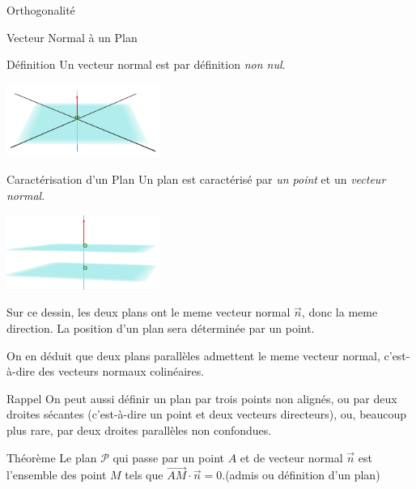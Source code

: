 \documentclass{cours}
\begin{document}
\begin{Gpartie}{Orthogonalité}
\begin{Spartie}{Vecteur Normal à un Plan}
\begin{SSpartie}{Définition}
                Un vecteur normal est par définition \emph{non nul}.
    
                \begin{center}
                        \includegraphics[width=5cm]{rsc/12fig3.png}
                    \parbox{\linewidth}{}
                \end{center}
            \end{SSpartie}
            \begin{SSpartie}{Caractérisation d'un Plan} 
                Un plan est caractérisé par \emph{un point} et un \emph{vecteur normal}.

                \begin{center}
                    \includegraphics[width=5cm]{rsc/12fig4.png}
                    \parbox{\linewidth}{}
                \end{center}
                
                                    Sur ce dessin, les deux plans ont le meme vecteur normal $\vec{n}$, donc la meme direction. La position d'un plan sera déterminée par un point.
                
                                    On en déduit que deux plans parallèles admettent le meme vecteur normal, c'est-à-dire des vecteurs normaux colinéaires.
                \begin{SSSpartie}{Rappel} 
                    On peut aussi définir un plan par trois points non alignés, ou par deux droites sécantes (c'est-à-dire un point et deux vecteurs directeurs), ou, beaucoup plus rare, par deux droites parallèles non confondues.
                \end{SSSpartie}
            \end{SSpartie}
            \pagebreak
            \begin{SSpartie}{Théorème} 
                Le plan $\mathcal{P}$ qui passe par un point $A$ et de vecteur normal $\vec{n}$ est l'ensemble des point $M$ tels que $\overrightarrow{AM}\cdot\vec{n}=0$.\quad (admis ou définition d'un plan)


\end{SSpartie}
\end{Spartie}
\end{Gpartie}
\end{document}
